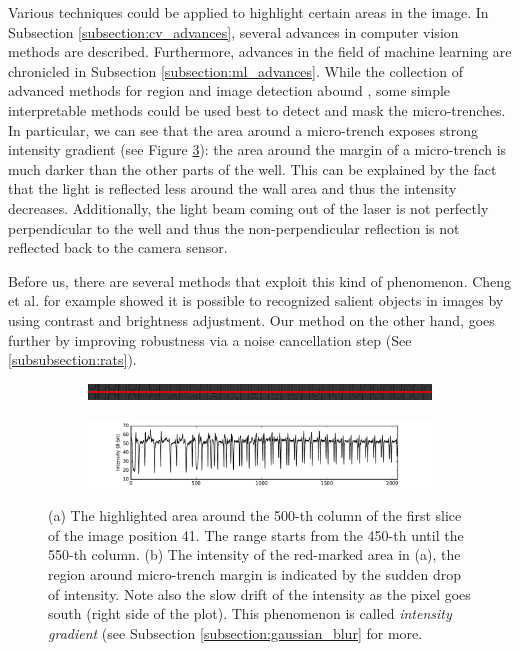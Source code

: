 \documentclass[pdftex,12pt,a4paper]{report}
\begin{document}
Various techniques could be applied to highlight certain areas in the image. In Subsection \ref{subsection:cv_advances}, several advances in computer vision methods are described. Furthermore, advances in the field of machine learning are chronicled in Subsection \ref{subsection:ml_advances}. While the collection of advanced methods for region and image detection abound \cite{krahenbuhl2011efficient, long2015fully, ronneberger2015u}, some simple interpretable methods could be used best to detect and mask the micro-trenches. In particular,  we can see that the area around a micro-trench exposes strong intensity gradient (see Figure \ref{fig:pos41_brightness}): the area around the margin of a micro-trench is much darker than the other parts of the well. This can be explained by the fact that the light is reflected less around the wall area and thus the intensity decreases. Additionally, the light beam coming out of the laser is not perfectly perpendicular to the well and thus the non-perpendicular reflection is not reflected back to the camera sensor.

Before us, there are several methods that exploit this kind of phenomenon. Cheng et al. \cite{cheng2015global} for example showed it is possible to recognized salient objects in images by using contrast and brightness adjustment. Our method on the other hand, goes further by improving robustness via a noise cancellation step (See \ref{subsubsection:rats}).

\begin{figure}[H]
\centering

\begin{subfigure}{0.8\textwidth}
  \centering
  \includegraphics[width=\textwidth]{images/pos_41_cut_highlight_y_500}
  \caption{}
  \label{fig:pos41_highlight}
\end{subfigure}%

\begin{subfigure}{\textwidth}
  \centering
  \includegraphics[width=\textwidth]{images/pos_41_cut_highlight_y_500_contrast}
  \caption{}
  \label{fig:pos41_contrast}
\end{subfigure}%
\caption[Example of intensity values along the vertical axis in an out-of-focus image]{(a) The highlighted area around the 500-th column of the first slice of the image position 41. The range starts from the 450-th until the 550-th column. (b) The intensity of the red-marked area in (a), the region around micro-trench margin is indicated by the sudden drop of intensity. Note also the slow drift of the intensity as the pixel goes south (right side of the plot). This phenomenon is called \textit{intensity gradient} (see Subsection \ref{subsection:gaussian_blur} for more.}
\label{fig:pos41_brightness}
\end{figure}
\end{document}
